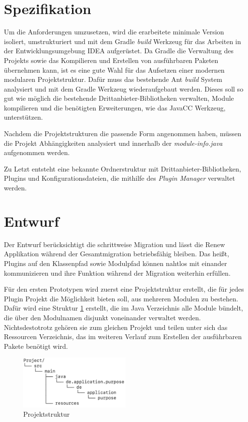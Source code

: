 \section{Spezifikation}
	Um die Anforderungen umzusetzen, wird die erarbeitete minimale Version isoliert, umstrukturiert und mit dem Gradle \textit{build} Werkzeug für das Arbeiten in der Entwicklungsumgebung IDEA aufgerüstet. Da Gradle die Verwaltung des Projekts sowie das Kompilieren und Erstellen von ausführbaren Paketen übernehmen kann, ist es eine gute Wahl für das Aufsetzen einer modernen modularen Projektstruktur.\newline 
	Dafür muss das bestehende Ant \textit{build} System analysiert und mit dem Gradle Werkzeug wiederaufgebaut werden. Dieses soll so gut wie möglich die bestehende Drittanbieter-Bibliotheken verwalten, Module kompilieren und die benötigten Erweiterungen, wie das JavaCC Werkzeug, unterstützen.\bigbreak

	Nachdem die Projektstrukturen die passende Form angenommen haben, müssen die Projekt Abhängigkeiten analysiert und innerhalb der \textit{module-info.java} aufgenommen werden.\bigbreak

	Zu Letzt entsteht eine bekannte Ordnerstruktur mit Drittanbieter-Bibliotheken, Plugins und Konfigurationsdateien, die mithilfe des \textit{Plugin Manager} verwaltet werden.

\section{Entwurf}
	Der Entwurf berücksichtigt die schrittweise Migration und lässt die Renew Applikation während der Gesamtmigration betriebsfähig bleiben. Das heißt, Plugins auf den Klassenpfad sowie Modulpfad können nahtlos mit einander kommunizieren und ihre Funktion während der Migration weiterhin erfüllen.\bigbreak

	Für den ersten Prototypen wird zuerst eine Projektstruktur erstellt, die für jedes Plugin Projekt die Möglichkeit bieten soll, aus mehreren Modulen zu bestehen. Dafür wird eine Struktur \ref{fig:projektstruktur} erstellt, die im Java Verzeichnis alle Module bündelt, die über den Modulnamen disjunkt voneinander verwaltet werden. Nichtsdestotrotz gehören sie zum gleichen Projekt und teilen unter sich das Ressourcen Verzeichnis, das im weiteren Verlauf zum Erstellen der ausführbaren Pakete benötigt wird.

	\begin{figure}[h!]
	  \centering
	  \includegraphics[width=0.5\textwidth]{material/images/project-structure.png}
	  \caption{Projektstruktur}
	  \label{fig:projektstruktur}
	\end{figure}
	       
